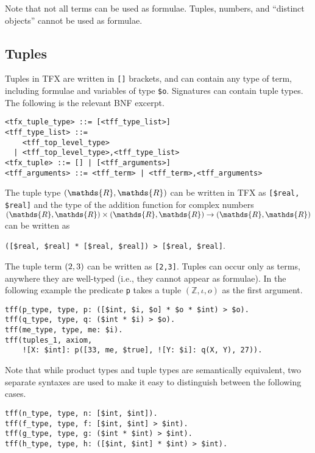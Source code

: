 Note that not all terms can be used as formulae.
Tuples, numbers, and ``distinct objects'' cannot be used as formulae.

\subsection{Tuples}

Tuples in TFX are written in {\tt []} brackets, and can contain any type of 
term, including formulae and variables of type \lstinline'$o'. 
Signatures can contain tuple types. 
The following is the relevant BNF excerpt.
\begin{lstlisting}[language=bnf]
<tfx_tuple_type> ::= [<tff_type_list>]
<tff_type_list> ::=
    <tff_top_level_type>
  | <tff_top_level_type>,<tff_type_list>
<tfx_tuple> ::= [] | [<tff_arguments>]
<tff_arguments> ::= <tff_term> | <tff_term>,<tff_arguments>
\end{lstlisting}

The tuple type $\tuple{\mathds{R},\mathds{R}}$ can be written in TFX 
as \lstinline|[$real, $real]| and the type of the addition function for 
complex numbers $\tuple{\mathds{R},\mathds{R}} \times 
\tuple{\mathds{R},\mathds{R}} \to \tuple{\mathds{R},\mathds{R}}$ can be 
written as \begin{center}\lstinline'([$real, $real] * [$real, $real]) > [$real, $real]'.\end{center}
The tuple term $({2,3})$ can be written as \lstinline'[2,3]'.
Tuples can occur only as terms, anywhere they are well-typed (i.e., they
cannot appear as formulae). In the following example the predicate \lstinline|p|
takes a tuple $(\mathds{Z},\iota,o)$ as the first argument.
\begin{lstlisting}[language=tptp]
tff(p_type, type, p: ([$int, $i, $o] * $o * $int) > $o).
tff(q_type, type, q: ($int * $i) > $o).
tff(me_type, type, me: $i).
tff(tuples_1, axiom,
    ![X: $int]: p([33, me, $true], ![Y: $i]: q(X, Y), 27)).
\end{lstlisting}

Note that while product types and tuple types are semantically equivalent,
two separate syntaxes are used to make it easy to distinguish 
between the following cases.
\begin{lstlisting}[language=tptp]
tff(n_type, type, n: [$int, $int]).
tff(f_type, type, f: [$int, $int] > $int).
tff(g_type, type, g: ($int * $int) > $int).
tff(h_type, type, h: ([$int, $int] * $int) > $int).
\end{lstlisting}

